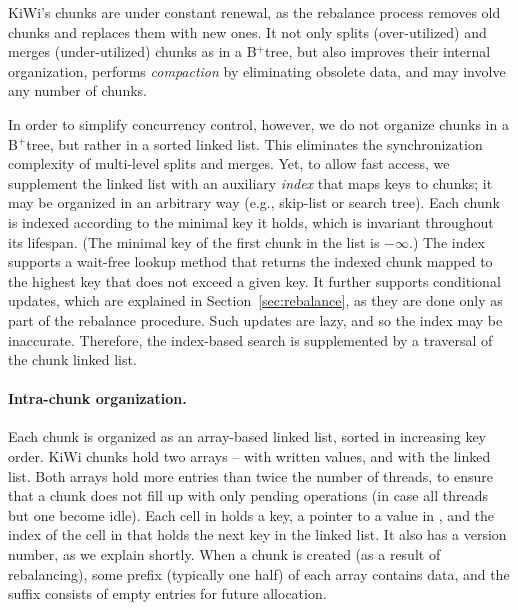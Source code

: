 KiWi's chunks are under constant renewal, as the rebalance process removes old chunks and replaces them with new ones.
It not only splits (over-utilized) and merges (under-utilized) chunks as in a B$^{+}$tree, but also improves their internal
organization, performs \emph{compaction} by eliminating obsolete data, and may involve any number of chunks.

In order to simplify concurrency control, however, we do not organize chunks in a B$^{+}$tree, but rather in a sorted linked list. This eliminates the synchronization complexity of  multi-level splits and merges.  Yet, to allow fast access, we supplement the linked list with an auxiliary \emph{index} that maps keys to chunks; it may be organized in an arbitrary way (e.g., skip-list or search tree).
Each chunk is indexed according to the minimal key it holds, which is invariant throughout its lifespan. 
(The minimal key of the first chunk in the list is $-\infty$.)
The index supports a wait-free
lookup method that returns the indexed chunk mapped to  the highest key that does not exceed a given {key}. It further supports conditional updates, which are explained in Section~\ref{sec:rebalance}, as they are done only as part of the rebalance procedure. Such updates are lazy, and so
the index may be inaccurate. Therefore, the index-based search is supplemented by a traversal of the chunk linked list.



\paragraph{Intra-chunk organization.}
Each chunk is organized as an array-based linked list, sorted in increasing key order.
KiWi chunks hold two arrays --  with written values, and  with the linked list.
Both arrays hold more entries than twice the number of threads, to ensure that a  chunk does not fill up with only pending operations (in case all threads but one become idle).
Each cell in  holds a key, a pointer 
to a value in , and the index of the cell in  that holds the next key in the linked list.
It also has a version number, as we explain shortly.
When a chunk is created (as a result of rebalancing), some prefix (typically one half) of each array contains data,
and the suffix consists of empty entries for future allocation.

